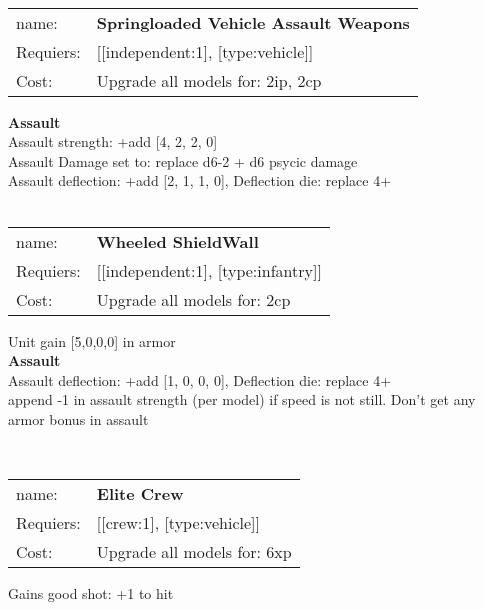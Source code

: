 \ \\
\begin{tabular}{ll}
name: & {\bf Springloaded Vehicle Assault Weapons } \\
Requiers: & [[independent:1], [type:vehicle]] \\
Cost: & Upgrade all models for: 2ip, 2cp \\
\end{tabular}





{\bf Assault} \ \\
Assault strength: +add [4, 2, 2, 0] 
\\ 
Assault Damage set to: replace d6-2 + d6 psycic damage
\\ 
Assault deflection: +add [2, 1, 1, 0], Deflection die: replace 4+
\\ 




\ \\
\begin{tabular}{ll}
name: & {\bf Wheeled ShieldWall } \\
Requiers: & [[independent:1], [type:infantry]] \\
Cost: & Upgrade all models for: 2cp \\
\end{tabular}

Unit gain [5,0,0,0] in armor\\ 




{\bf Assault} \ \\
Assault deflection: +add [1, 0, 0, 0], Deflection die: replace 4+
\\ 

append -1 in assault strength (per model) if speed is not still. Don't get any armor bonus in assault


\ \\
\begin{tabular}{ll}
name: & {\bf Elite Crew } \\
Requiers: & [[crew:1], [type:vehicle]] \\
Cost: & Upgrade all models for: 6xp \\
\end{tabular}

Gains good shot: +1 to hit\\ 









